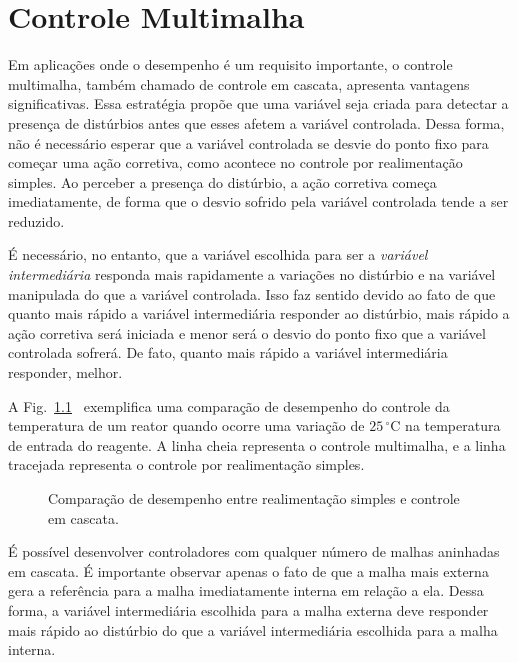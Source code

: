 
\chapter{Controle Multimalha}\label{controle}

	Em aplicações onde o desempenho é um requisito importante, o controle multimalha, também chamado de controle em cascata, apresenta vantagens significativas. Essa estratégia propõe que uma variável seja criada para detectar a presença de distúrbios antes que esses afetem a variável controlada. Dessa forma, não é necessário esperar que a variável controlada se desvie do ponto fixo para começar uma ação corretiva, como acontece no controle por realimentação simples. Ao perceber a presença do distúrbio, a ação corretiva começa imediatamente, de forma que o desvio sofrido pela variável controlada tende a ser reduzido.

  É necessário, no entanto, que a variável escolhida para ser a \emph{variável intermediária} responda mais rapidamente a variações no distúrbio e na variável manipulada do que a variável controlada. Isso faz sentido devido ao fato de que quanto mais rápido a variável intermediária responder ao distúrbio, mais rápido a ação corretiva será iniciada e menor será o desvio do ponto fixo que a variável controlada sofrerá. De fato, quanto mais rápido a variável intermediária responder, melhor.

  A Fig.~\ref{fig:realimentacao_vs_cascata}~\cite{ref:SMITH} exemplifica uma comparação de desempenho do controle da temperatura de um reator quando ocorre uma variação de $25\,^{\circ}\mathrm{C}$ na temperatura de entrada do reagente. A linha cheia representa o controle multimalha, e a linha tracejada representa o controle por realimentação simples.

  \begin{figure}[htb]
    \renewcommand\figurename{Fig.}
    \caption{Comparação de desempenho entre realimentação simples e controle em cascata.}
    \label{fig:realimentacao_vs_cascata}
  \end{figure}

  É possível desenvolver controladores com qualquer número de malhas aninhadas em cascata. É importante observar apenas o fato de que a malha mais externa gera a referência para a malha imediatamente interna em relação a ela. Dessa forma, a variável intermediária escolhida para a malha externa deve responder mais rápido ao distúrbio do que a variável intermediária escolhida para a malha interna.

